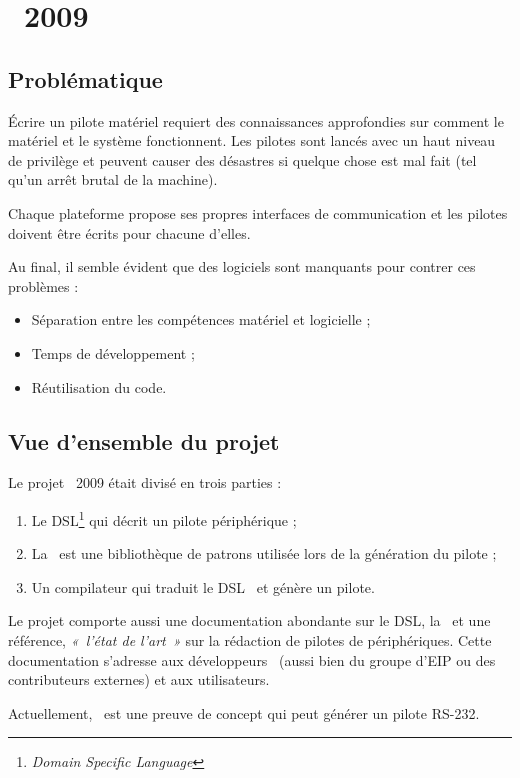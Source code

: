 \documentclass[chapterprefix=off]{rtxreport}
\begin{document}
\chapter{\rtx\ 2009}

\section{Problématique}

Écrire un pilote matériel requiert des connaissances approfondies sur comment le
matériel et le système fonctionnent. Les pilotes sont lancés avec un haut niveau
de privilège et peuvent causer des désastres si quelque chose est mal fait
(tel qu'un arrêt brutal de la machine).

Chaque plateforme propose ses propres interfaces de communication et les
pilotes doivent être écrits pour chacune d'elles.

Au final, il semble évident que des logiciels sont manquants pour contrer ces
problèmes :
\begin{itemize}
\item Séparation entre les compétences matériel et logicielle ;
\item Temps de développement ;
\item Réutilisation du code.
\end{itemize}

\section{Vue d'ensemble du projet}

Le projet \rtx\ 2009 était divisé en trois parties :
\begin{enumerate}
\item Le DSL\footnote{\emph{Domain Specific Language}} qui décrit un pilote
périphérique ;
\item La \BL\ est une bibliothèque de patrons utilisée lors de la génération
du pilote ;
\item Un compilateur qui traduit le DSL \rtx\ et génère un pilote.
\end{enumerate}

Le projet comporte aussi une documentation abondante sur le DSL, la \BL\ et une
référence, \emph{«~l'état de l'art~»} sur la rédaction de pilotes de
périphériques. Cette documentation s'adresse aux développeurs \rtx\ (aussi bien
du groupe d'EIP ou des contributeurs externes) et aux utilisateurs.

Actuellement, \rtx\ est une preuve de concept qui peut générer un pilote RS-232.
\end{document}
